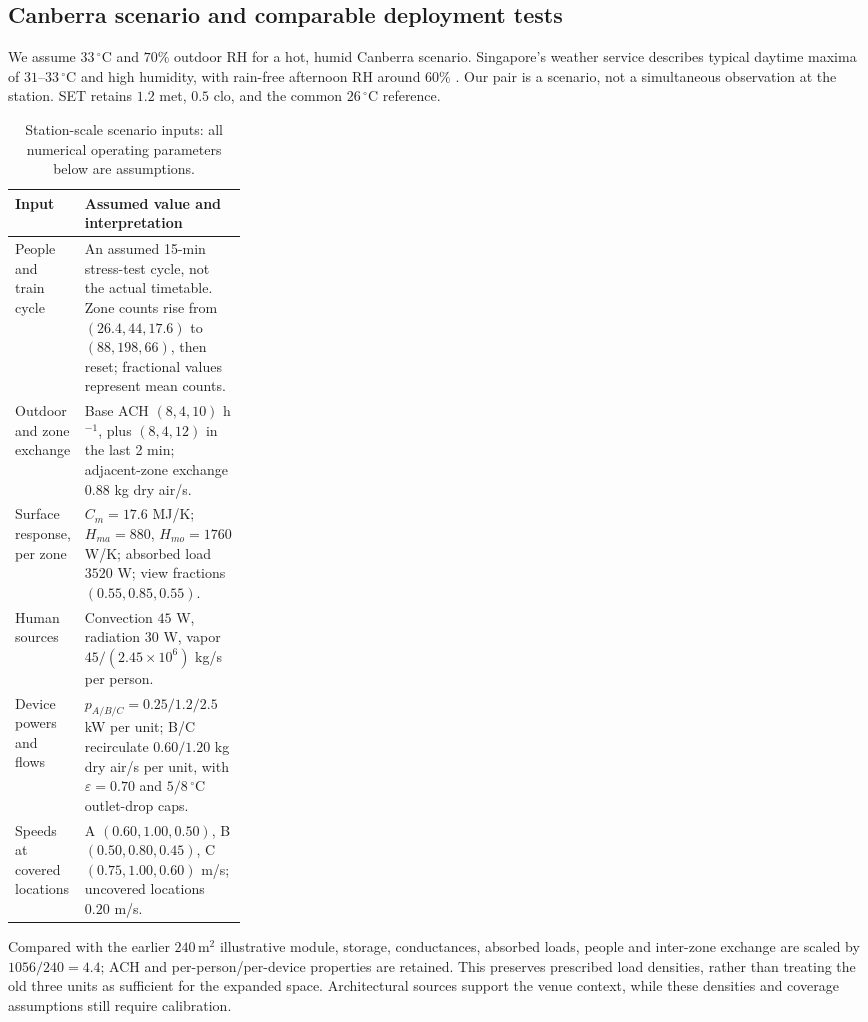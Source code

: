\subsection{Canberra scenario and comparable deployment tests}

We assume $33\,^{\circ}\mathrm C$ and $70\%$ outdoor RH for a hot, humid Canberra scenario. Singapore's weather service describes typical daytime maxima of $31$--$33\,^{\circ}\mathrm C$ and high humidity, with rain-free afternoon RH around $60\%$ \cite{singapore-climate}. Our pair is a scenario, not a simultaneous observation at the station. SET retains $1.2$ met, $0.5$ clo, and the common $26\,^{\circ}\mathrm C$ reference.

\begin{table}[!ht]
\centering\small
\caption{Station-scale scenario inputs: all numerical operating parameters below are assumptions.}
\label{tab:rail-inputs}
\begin{tabularx}{\linewidth}{@{}>{\raggedright\arraybackslash}p{0.27\linewidth}>{\raggedright\arraybackslash}X@{}}
\toprule
Input & Assumed value and interpretation\\
\midrule
People and train cycle & An assumed 15-min stress-test cycle, not the actual timetable. Zone counts rise from $(26.4,44,17.6)$ to $(88,198,66)$, then reset; fractional values represent mean counts.\\
Outdoor and zone exchange & Base ACH $(8,4,10)$ h$^{-1}$, plus $(8,4,12)$ in the last 2 min; adjacent-zone exchange $0.88$ kg dry air/s.\\
Surface response, per zone & $C_m=17.6$ MJ/K; $H_{ma}=880$, $H_{mo}=1760$ W/K; absorbed load $3520$ W; view fractions $(0.55,0.85,0.55)$.\\
Human sources & Convection $45$ W, radiation $30$ W, vapor $45/(2.45\times10^6)$ kg/s per person.\\
Device powers and flows & $p_{A/B/C}=0.25/1.2/2.5$ kW per unit; B/C recirculate $0.60/1.20$ kg dry air/s per unit, with $\varepsilon=0.70$ and $5/8\,^{\circ}\mathrm C$ outlet-drop caps.\\
Speeds at covered locations & A $(0.60,1.00,0.50)$, B $(0.50,0.80,0.45)$, C $(0.75,1.00,0.60)$ m/s; uncovered locations $0.20$ m/s.\\
\bottomrule
\end{tabularx}
\end{table}

Compared with the earlier $240\,\mathrm{m^2}$ illustrative module, storage, conductances, absorbed loads, people and inter-zone exchange are scaled by $1056/240=4.4$; ACH and per-person/per-device properties are retained. This preserves prescribed load densities, rather than treating the old three units as sufficient for the expanded space. Architectural sources support the venue context, while these densities and coverage assumptions still require calibration.

